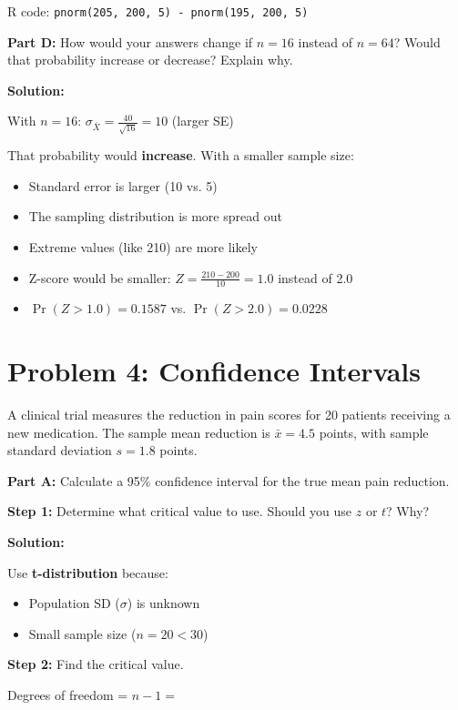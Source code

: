 \documentclass[11pt]{article}
\begin{document}
R code: \texttt{pnorm(205, 200, 5) - pnorm(195, 200, 5)}

\vspace{0.5cm}

\textbf{Part D:} How would your answers change if $n = 16$ instead of $n = 64$? Would that probability increase or decrease? Explain why.

\textcolor{correctgreen}{\textbf{Solution:}}

With $n = 16$: $\sigma_{\bar{X}} = \frac{40}{\sqrt{16}} = 10$ (larger SE)

That probability would \textbf{increase}. With a smaller sample size:
\begin{itemize}
\item Standard error is larger (10 vs. 5)
\item The sampling distribution is more spread out
\item Extreme values (like 210) are more likely
\item Z-score would be smaller: $Z = \frac{210-200}{10} = 1.0$ instead of 2.0
\item $\Pr(Z > 1.0) = 0.1587$ vs. $\Pr(Z > 2.0) = 0.0228$
\end{itemize}

\newpage

\section{Problem 4: Confidence Intervals}

A clinical trial measures the reduction in pain scores for 20 patients receiving a new medication. The sample mean reduction is $\bar{x} = 4.5$ points, with sample standard deviation $s = 1.8$ points.

\textbf{Part A:} Calculate a 95\% confidence interval for the true mean pain reduction.

\textbf{Step 1:} Determine what critical value to use. Should you use $z$ or $t$? Why?

\textcolor{correctgreen}{\textbf{Solution:}}

Use \textbf{t-distribution} because:
\begin{itemize}
\item Population SD ($\sigma$) is unknown
\item Small sample size ($n = 20 < 30$)
\end{itemize}

\textbf{Step 2:} Find the critical value.

Degrees of freedom = $n - 1 = $
\end{document}
